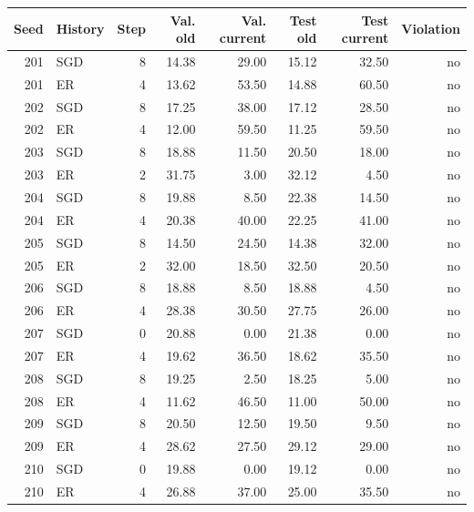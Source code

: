 \begin{tabular}{rlrrrrrr}
\toprule
Seed & History & Step & Val. old & Val. current & Test old & Test current & Violation \\
\midrule
201 & SGD & 8 & 14.38 & 29.00 & 15.12 & 32.50 & no \\
201 & ER & 4 & 13.62 & 53.50 & 14.88 & 60.50 & no \\
202 & SGD & 8 & 17.25 & 38.00 & 17.12 & 28.50 & no \\
202 & ER & 4 & 12.00 & 59.50 & 11.25 & 59.50 & no \\
203 & SGD & 8 & 18.88 & 11.50 & 20.50 & 18.00 & no \\
203 & ER & 2 & 31.75 & 3.00 & 32.12 & 4.50 & no \\
204 & SGD & 8 & 19.88 & 8.50 & 22.38 & 14.50 & no \\
204 & ER & 4 & 20.38 & 40.00 & 22.25 & 41.00 & no \\
205 & SGD & 8 & 14.50 & 24.50 & 14.38 & 32.00 & no \\
205 & ER & 2 & 32.00 & 18.50 & 32.50 & 20.50 & no \\
206 & SGD & 8 & 18.88 & 8.50 & 18.88 & 4.50 & no \\
206 & ER & 4 & 28.38 & 30.50 & 27.75 & 26.00 & no \\
207 & SGD & 0 & 20.88 & 0.00 & 21.38 & 0.00 & no \\
207 & ER & 4 & 19.62 & 36.50 & 18.62 & 35.50 & no \\
208 & SGD & 8 & 19.25 & 2.50 & 18.25 & 5.00 & no \\
208 & ER & 4 & 11.62 & 46.50 & 11.00 & 50.00 & no \\
209 & SGD & 8 & 20.50 & 12.50 & 19.50 & 9.50 & no \\
209 & ER & 4 & 28.62 & 27.50 & 29.12 & 29.00 & no \\
210 & SGD & 0 & 19.88 & 0.00 & 19.12 & 0.00 & no \\
210 & ER & 4 & 26.88 & 37.00 & 25.00 & 35.50 & no \\
\bottomrule
\end{tabular}
